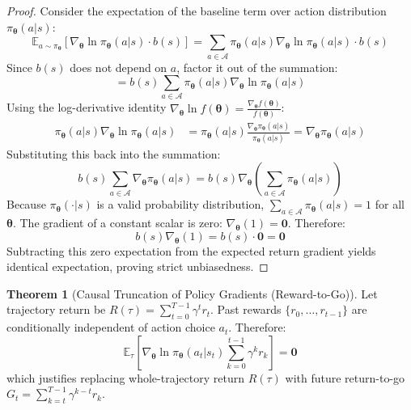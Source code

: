 \documentclass[11pt,a4paper]{article}
\theoremstyle{definition}
\newtheorem{theorem}{\textbf{Theorem}}[section]
\begin{document}
\begin{proof}
Consider the expectation of the baseline term over action distribution $\pi_{\boldsymbol{\theta}}(a | s)$:
{\boldmath
\begin{equation}
\mathbb{E}_{a \sim \pi_{\boldsymbol{\theta}}} \left[ \nabla_{\boldsymbol{\theta}} \ln \pi_{\boldsymbol{\theta}}(a | s) \cdot b(s) \right] = \sum_{a \in \mathcal{A}} \pi_{\boldsymbol{\theta}}(a | s) \nabla_{\boldsymbol{\theta}} \ln \pi_{\boldsymbol{\theta}}(a | s) \cdot b(s)
\end{equation}
}
Since $b(s)$ does not depend on $a$, factor it out of the summation:
{\boldmath
\begin{equation}
= b(s) \sum_{a \in \mathcal{A}} \pi_{\boldsymbol{\theta}}(a | s) \nabla_{\boldsymbol{\theta}} \ln \pi_{\boldsymbol{\theta}}(a | s)
\end{equation}
}
Using the log-derivative identity $\nabla_{\boldsymbol{\theta}} \ln f(\boldsymbol{\theta}) = \frac{\nabla_{\boldsymbol{\theta}} f(\boldsymbol{\theta})}{f(\boldsymbol{\theta})}$:
{\boldmath
\begin{align}
\pi_{\boldsymbol{\theta}}(a | s) \nabla_{\boldsymbol{\theta}} \ln \pi_{\boldsymbol{\theta}}(a | s) &= \pi_{\boldsymbol{\theta}}(a | s) \frac{\nabla_{\boldsymbol{\theta}} \pi_{\boldsymbol{\theta}}(a | s)}{\pi_{\boldsymbol{\theta}}(a | s)} = \nabla_{\boldsymbol{\theta}} \pi_{\boldsymbol{\theta}}(a | s)
\end{align}
}
Substituting this back into the summation:
{\boldmath
\begin{equation}
b(s) \sum_{a \in \mathcal{A}} \nabla_{\boldsymbol{\theta}} \pi_{\boldsymbol{\theta}}(a | s) = b(s) \nabla_{\boldsymbol{\theta}} \left( \sum_{a \in \mathcal{A}} \pi_{\boldsymbol{\theta}}(a | s) \right)
\end{equation}
}
Because $\pi_{\boldsymbol{\theta}}(\cdot | s)$ is a valid probability distribution, $\sum_{a \in \mathcal{A}} \pi_{\boldsymbol{\theta}}(a | s) = 1$ for all $\boldsymbol{\theta}$.
The gradient of a constant scalar is zero: $\nabla_{\boldsymbol{\theta}} (1) = \mathbf{0}$.
Therefore:
{\boldmath
\begin{equation}
b(s) \nabla_{\boldsymbol{\theta}}(1) = b(s) \cdot \mathbf{0} = \mathbf{0}
\end{equation}
}
Subtracting this zero expectation from the expected return gradient yields identical expectation, proving strict unbiasedness.
\end{proof}

\begin{theorem}[Causal Truncation of Policy Gradients (Reward-to-Go)]
Let trajectory return be $R(\tau) = \sum_{t=0}^{T-1} \gamma^t r_t$. Past rewards $\{r_0, \dots, r_{t-1}\}$ are conditionally independent of action choice $a_t$. Therefore:
{\boldmath
\begin{equation}
\mathbb{E}_{\tau} \left[ \nabla_{\boldsymbol{\theta}} \ln \pi_{\boldsymbol{\theta}}(a_t | s_t) \sum_{k=0}^{t-1} \gamma^k r_k \right] = \mathbf{0}
\end{equation}
}
which justifies replacing whole-trajectory return $R(\tau)$ with future return-to-go $G_t = \sum_{k=t}^{T-1} \gamma^{k-t} r_k$.
\end{theorem}
\end{document}
